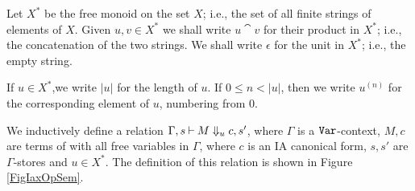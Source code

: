 \documentclass[11pt]{report}
\begin{document}
\begin{definition}
  Let $X^*$ be the free monoid on the set $X$; i.e., the set of all finite strings of elements of $X$.
  Given $u,v\in X^*$ we shall write $u\cat v$ for their product in $X^*$; i.e., the concatenation of the two strings.
  We shall write $\epsilon$ for the unit in $X^*$; i.e., the empty string.

  If $u\in X^*$,we write $|u|$ for the length of $u$.
  If $0\le n < |u|$, then we write $u^{(n)}$ for the corresponding element of $u$, numbering from $0$.

  We inductively define a relation $\Gamma,s\mathbin{\vdash} M\Downarrow_u c,s'$, where $\Gamma$ is a ${\mathtt{Var}}$-context, $M,c$ are terms of \IAX with all free variables in $\Gamma$, where $c$ is an IA canonical form, $s,s'$ are $\Gamma$-stores and $u\in X^*$.
  The definition of this relation is shown in Figure \ref{FigIaxOpSem}.


\end{definition}
\end{document}
